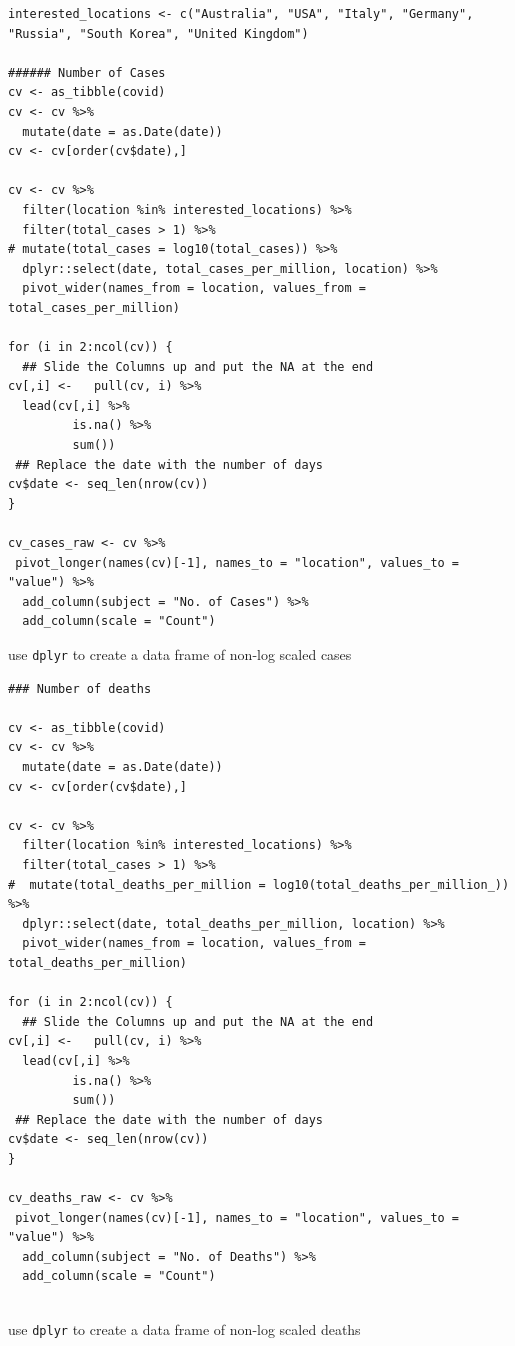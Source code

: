 \documentclass[11pt]{article}
\begin{document}
\begin{listing}[htbp]
\begin{verbatim}
interested_locations <- c("Australia", "USA", "Italy", "Germany", "Russia", "South Korea", "United Kingdom")

###### Number of Cases
cv <- as_tibble(covid)
cv <- cv %>%
  mutate(date = as.Date(date))
cv <- cv[order(cv$date),]

cv <- cv %>%
  filter(location %in% interested_locations) %>%
  filter(total_cases > 1) %>%
# mutate(total_cases = log10(total_cases)) %>%
  dplyr::select(date, total_cases_per_million, location) %>%
  pivot_wider(names_from = location, values_from = total_cases_per_million)

for (i in 2:ncol(cv)) {
  ## Slide the Columns up and put the NA at the end
cv[,i] <-   pull(cv, i) %>%
  lead(cv[,i] %>%
         is.na() %>%
         sum())
 ## Replace the date with the number of days
cv$date <- seq_len(nrow(cv))
}

cv_cases_raw <- cv %>%
 pivot_longer(names(cv)[-1], names_to = "location", values_to = "value") %>%
  add_column(subject = "No. of Cases") %>%
  add_column(scale = "Count")

\end{verbatim}
\caption{\label{org7039710}use \texttt{dplyr} to create a data frame of non-log scaled cases}
\end{listing}

\begin{listing}[htbp]
\begin{verbatim}
### Number of deaths

cv <- as_tibble(covid)
cv <- cv %>%
  mutate(date = as.Date(date))
cv <- cv[order(cv$date),]

cv <- cv %>%
  filter(location %in% interested_locations) %>%
  filter(total_cases > 1) %>%
#  mutate(total_deaths_per_million = log10(total_deaths_per_million_)) %>%
  dplyr::select(date, total_deaths_per_million, location) %>%
  pivot_wider(names_from = location, values_from = total_deaths_per_million)

for (i in 2:ncol(cv)) {
  ## Slide the Columns up and put the NA at the end
cv[,i] <-   pull(cv, i) %>%
  lead(cv[,i] %>%
         is.na() %>%
         sum())
 ## Replace the date with the number of days
cv$date <- seq_len(nrow(cv))
}

cv_deaths_raw <- cv %>%
 pivot_longer(names(cv)[-1], names_to = "location", values_to = "value") %>%
  add_column(subject = "No. of Deaths") %>%
  add_column(scale = "Count")


\end{verbatim}
\caption{\label{orga037033}use \texttt{dplyr} to create a data frame of non-log scaled deaths}
\end{listing}
\end{document}
